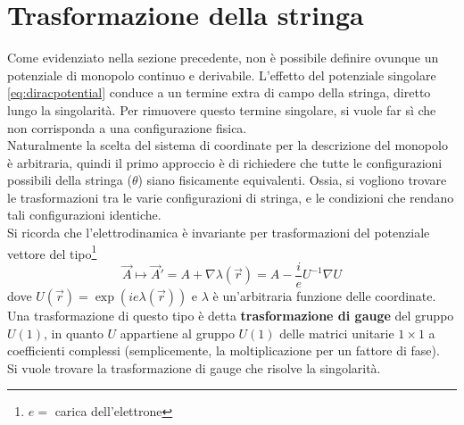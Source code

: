 
\section{Trasformazione della stringa}\label{sec:gaugestring}
Come evidenziato nella sezione precedente, non è possibile definire ovunque un
potenziale di monopolo continuo e derivabile. L'effetto del potenziale singolare
\ref{eq:diracpotential} conduce a un termine extra di campo della stringa,
diretto lungo la singolarità.
Per rimuovere questo termine singolare, si vuole far sì che non corrisponda a una
configurazione fisica.\\
Naturalmente la scelta del sistema di coordinate per la descrizione del monopolo
è arbitraria, quindi il primo approccio è di richiedere che tutte le configurazioni
possibili della stringa ($\theta$) siano fisicamente equivalenti.
Ossia, si vogliono trovare le trasformazioni tra le varie configurazioni di stringa,
e le condizioni che rendano tali configurazioni identiche.\\

Si ricorda che l'elettrodinamica è invariante per trasformazioni del potenziale
vettore del tipo\footnote{$e =$ carica dell'elettrone}
\begin{equation}
   \vec A \mapsto \vec A' = A + \nabla \lambda (\vec r) = A - \frac{i}{e}
    U^{-1}\nabla U
\end{equation}
dove $U(\vec r) = \exp(ie\lambda(\vec r))$ e $\lambda$ è un'arbitraria funzione
delle coordinate. Una trasformazione di questo tipo è detta
\textbf{trasformazione di gauge}  del gruppo $U(1)$, in quanto $U$ appartiene
  al gruppo $U(1)$ delle matrici unitarie $1 \times 1$ a coefficienti complessi
  (semplicemente, la moltiplicazione per un fattore di fase).\\

Si vuole trovare la trasformazione di gauge che risolve la singolarità.\\

